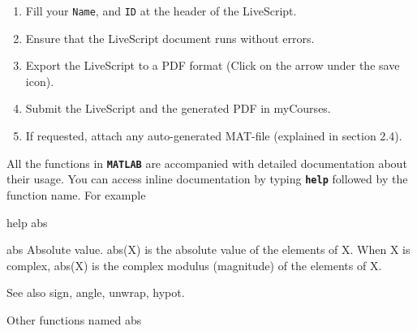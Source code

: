 \documentclass{article}
\begin{document}
\begin{enumerate}
\setlength{\itemsep}{-1ex}
   \item{\begin{flushleft} Fill your \texttt{Name}, and \texttt{ID} at the header of the LiveScript. \end{flushleft}}
   \item{\begin{flushleft} Ensure that the LiveScript document runs without errors. \end{flushleft}}
   \item{\begin{flushleft} Export the LiveScript to a PDF format (Click on the arrow under the save icon). \end{flushleft}}
   \item{\begin{flushleft} Submit the LiveScript and the generated PDF in myCourses. \end{flushleft}}
   \item{\begin{flushleft} If requested, attach any auto-generated MAT-file (explained in section 2.4). \end{flushleft}}
\end{enumerate}



\begin{par}
\begin{flushleft}
All the functions in \texttt{\textbf{MATLAB}} are accompanied with detailed documentation about their usage. You can access inline documentation by typing \texttt{\textbf{help}} followed by the function name. For example
\end{flushleft}
\end{par}

\begin{matlabcode}
help abs
\end{matlabcode}
\begin{matlaboutput}
 abs    Absolute value.
    abs(X) is the absolute value of the elements of X. When
    X is complex, abs(X) is the complex modulus (magnitude) of
    the elements of X.
 
    See also sign, angle, unwrap, hypot.

    Other functions named abs
\end{matlaboutput}
\end{document}
